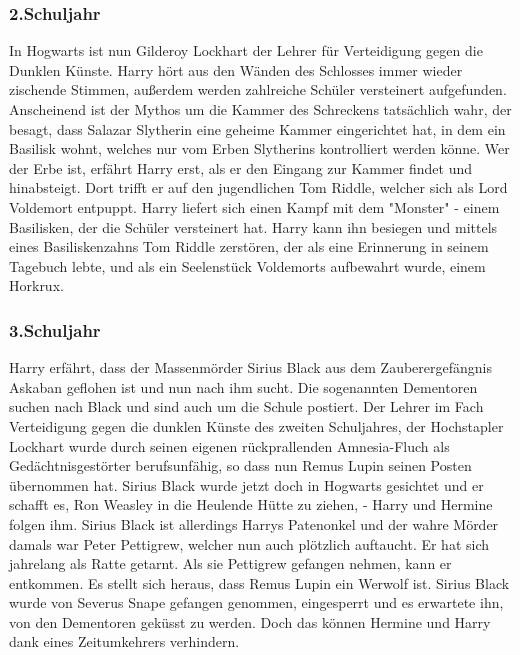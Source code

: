 \documentclass[a4paper, 10pt]{article}
\begin{document}
\subsubsection*{\large 2.Schuljahr}
In Hogwarts ist nun Gilderoy Lockhart der Lehrer für Verteidigung gegen die Dunklen Künste. Harry hört aus den Wänden des Schlosses immer wieder zischende Stimmen, außerdem werden zahlreiche Schüler versteinert aufgefunden.
\vspace{10pt}
\newline
{}  
Anscheinend ist der Mythos um die Kammer des Schreckens tatsächlich wahr, der besagt, dass Salazar Slytherin eine geheime Kammer eingerichtet hat, in dem ein Basilisk wohnt, welches nur vom Erben Slytherins kontrolliert werden könne.
\vspace{10pt}
\newline
{}  
Wer der Erbe ist, erfährt Harry erst, als er den Eingang zur Kammer findet und hinabsteigt. Dort trifft er auf den jugendlichen Tom Riddle, welcher sich als Lord Voldemort entpuppt. Harry liefert sich einen Kampf mit dem "Monster" - einem Basilisken, der die Schüler versteinert hat. Harry kann ihn besiegen und mittels eines Basiliskenzahns Tom Riddle zerstören, der als eine Erinnerung in seinem Tagebuch lebte, und als ein Seelenstück Voldemorts aufbewahrt wurde, einem Horkrux.
\subsubsection*{\large 3.Schuljahr}
Harry erfährt, dass der Massenmörder Sirius Black aus dem Zauberergefängnis Askaban geflohen ist und nun nach ihm sucht. Die sogenannten Dementoren suchen nach Black und sind auch um die Schule postiert.
\vspace{10pt}
\newline
{}  
Der Lehrer im Fach Verteidigung gegen die dunklen Künste des zweiten Schuljahres, der Hochstapler Lockhart wurde durch seinen eigenen rückprallenden Amnesia-Fluch als Gedächtnisgestörter berufsunfähig, so dass nun Remus Lupin seinen Posten übernommen hat. Sirius Black wurde jetzt doch in Hogwarts gesichtet und er schafft es, Ron Weasley in die Heulende Hütte zu ziehen, - Harry und Hermine folgen ihm.
\vspace{10pt}
\newline
{}  
Sirius Black ist allerdings Harrys Patenonkel und der wahre Mörder damals war Peter Pettigrew, welcher nun auch plötzlich auftaucht. Er hat sich jahrelang als Ratte getarnt. Als sie Pettigrew gefangen nehmen, kann er entkommen.
\vspace{10pt}
\newline
{}  
Es stellt sich heraus, dass Remus Lupin ein Werwolf ist. Sirius Black wurde von Severus Snape gefangen genommen, eingesperrt und es erwartete ihn, von den Dementoren geküsst zu werden. Doch das können Hermine und Harry dank eines Zeitumkehrers verhindern.
\end{document}
